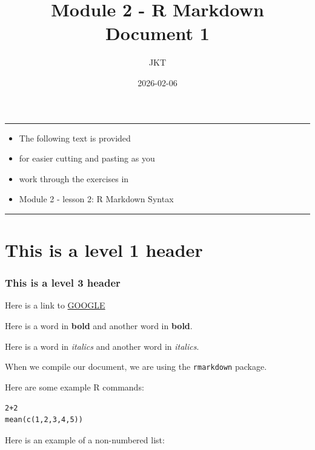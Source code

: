 \documentclass[
]{article}
\title{Module 2 - R Markdown Document 1}
\author{JKT}
\date{2026-02-06}
\providecommand{\tightlist}{%
  \setlength{\itemsep}{0pt}\setlength{\parskip}{0pt}}
\begin{document}
\maketitle

\begin{center}\rule{0.5\linewidth}{0.5pt}\end{center}

\begin{itemize}
\tightlist
\item
  The following text is provided
\item
  for easier cutting and pasting as you
\item
  work through the exercises in
\item
  Module 2 - lesson 2: R Markdown Syntax
\end{itemize}

\begin{center}\rule{0.5\linewidth}{0.5pt}\end{center}

\section{This is a level 1 header}\label{this-is-a-level-1-header}

\subsubsection{This is a level 3 header}\label{this-is-a-level-3-header}

Here is a link to \href{https://www.google.com/}{GOOGLE}

Here is a word in \textbf{bold} and another word in \textbf{bold}.

Here is a word in \emph{italics} and another word in \emph{italics}.

When we compile our document, we are using the \texttt{rmarkdown}
package.

Here are some example R commands:

\begin{verbatim}
2+2
mean(c(1,2,3,4,5))
\end{verbatim}

Here is an example of a non-numbered list:
\end{document}
